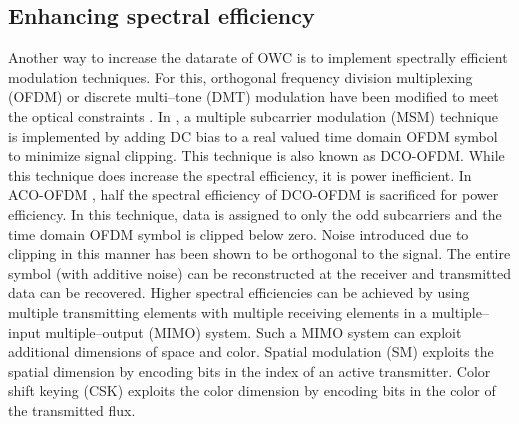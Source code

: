 \subsection{Enhancing spectral efficiency}
\label{relatedSpectral}
Another way to increase the datarate of OWC is to implement spectrally efficient modulation techniques. For this, orthogonal frequency division multiplexing (OFDM) or discrete multi--tone (DMT) modulation have been modified to meet the optical constraints \cite{vuc09a,mes10a,mes10b,dis11a}. In \cite{car96a}, a multiple subcarrier modulation (MSM) technique is implemented by adding DC bias to a real valued time domain OFDM symbol to minimize signal clipping. This technique is also known as DCO-OFDM. While this technique does increase the spectral efficiency, it is power inefficient. In ACO-OFDM \cite{arm06a}, half the spectral efficiency of DCO-OFDM is sacrificed for power efficiency. In this technique, data is assigned to only the odd subcarriers and the time domain OFDM symbol is clipped below zero. Noise introduced due to clipping in this manner has been shown to be orthogonal to the signal. The entire symbol (with additive noise) can be reconstructed at the receiver and transmitted data can be recovered. Higher spectral efficiencies can be achieved by using multiple transmitting elements with multiple receiving elements in a multiple--input multiple--output (MIMO) system. Such a MIMO system can exploit additional dimensions of space and color. Spatial modulation (SM) \cite{mes06a} exploits the spatial dimension by encoding bits in the index of an active transmitter. Color shift keying (CSK) \cite{IEEE802.15.7} exploits the color dimension by encoding bits in the color of the transmitted flux.

